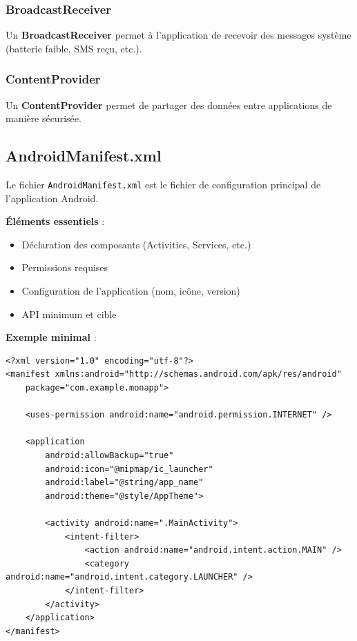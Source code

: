 \documentclass[11pt,a4paper]{article}
\begin{document}
\subsubsection{BroadcastReceiver}

Un \textbf{BroadcastReceiver} permet à l'application de recevoir des messages système (batterie faible, SMS reçu, etc.).

\subsubsection{ContentProvider}

Un \textbf{ContentProvider} permet de partager des données entre applications de manière sécurisée.

\subsection{AndroidManifest.xml}

Le fichier \texttt{AndroidManifest.xml} est le fichier de configuration principal de l'application Android.

\textbf{Éléments essentiels} :
\begin{itemize}
    \item Déclaration des composants (Activities, Services, etc.)
    \item Permissions requises
    \item Configuration de l'application (nom, icône, version)
    \item API minimum et cible
\end{itemize}

\textbf{Exemple minimal} :
\begin{lstlisting}[style=XML]
<?xml version="1.0" encoding="utf-8"?>
<manifest xmlns:android="http://schemas.android.com/apk/res/android"
    package="com.example.monapp">
    
    <uses-permission android:name="android.permission.INTERNET" />
    
    <application
        android:allowBackup="true"
        android:icon="@mipmap/ic_launcher"
        android:label="@string/app_name"
        android:theme="@style/AppTheme">
        
        <activity android:name=".MainActivity">
            <intent-filter>
                <action android:name="android.intent.action.MAIN" />
                <category android:name="android.intent.category.LAUNCHER" />
            </intent-filter>
        </activity>
    </application>
</manifest>
\end{lstlisting}
\end{document}
